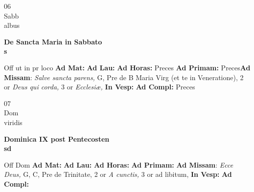\documentclass[10pt, openany]{book}
\begin{document}
    \begin{center}
        \begin{minipage}{3.5in}
            \vspace{2em}
            \begin{minipage}{0.5in}
                {\Huge 06} \\
                {\normalsize Sabb} \\
                {\normalsize albus}
            \end{minipage}
            \begin{minipage}{3.0in}
                \textbf{ \large De Sancta Maria in Sabbato \\
                \textnormal{\normalsize s}} \\ 
            \end{minipage}
            \begin{justify}Off ut in pr loco
                \textbf{Ad Mat: }
                \textbf{Ad Lau: }
                \textbf{Ad Horas: }Preces
                \textbf{Ad Primam: }Preces\textbf{Ad Missam}: \textit{Salve sancta parens,} G, Pre de B Maria Virg (et te in Veneratione), 2 or \textit{Deus qui corda,} 3 or \textit{Ecclesiæ,}  
                \textbf{In Vesp: }
                \textbf{Ad Compl: }Preces
            \end{justify}
        \end{minipage}
    \end{center}

    \begin{center}
        \begin{minipage}{3.5in}
            \vspace{2em}
            \begin{minipage}{0.5in}
                {\Huge 07} \\
                {\normalsize Dom} \\
                {\normalsize viridis}
            \end{minipage}
            \begin{minipage}{3.0in}
                \textbf{ \large Dominica IX post Pentecosten \\
                \textnormal{\normalsize sd}} \\ 
            \end{minipage}
            \begin{justify}Off Dom
                \textbf{Ad Mat: }
                \textbf{Ad Lau: }
                \textbf{Ad Horas: }
                \textbf{Ad Primam: }\textbf{Ad Missam}: \textit{Ecce Deus,} G, C, Pre de Trinitate, 2 or \textit{A cunctis,} 3 or ad libitum,  
                \textbf{In Vesp: }
                \textbf{Ad Compl: }
            \end{justify}
        \end{minipage}
    \end{center}
\end{document}
